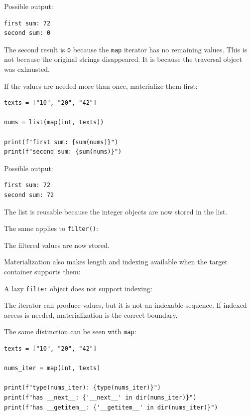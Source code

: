 Possible output:

\begin{verbatim}
first sum: 72
second sum: 0
\end{verbatim}

The second result is \texttt{0} because the \texttt{map} iterator has no remaining values. This is not because the original strings disappeared. It is because the traversal object was exhausted.

If the values are needed more than once, materialize them first:

\begin{verbatim}
texts = ["10", "20", "42"]

nums = list(map(int, texts))

print(f"first sum: {sum(nums)}")
print(f"second sum: {sum(nums)}")
\end{verbatim}

Possible output:

\begin{verbatim}
first sum: 72
second sum: 72
\end{verbatim}

The list is reusable because the integer objects are now stored in the list.

The same applies to \texttt{filter()}:



The filtered values are now stored.

Materialization also makes length and indexing available when the target container supports them:



A lazy \texttt{filter} object does not support indexing:



The iterator can produce values, but it is not an indexable sequence. If indexed access is needed, materialization is the correct boundary.

The same distinction can be seen with \texttt{map}:

\begin{verbatim}
texts = ["10", "20", "42"]

nums_iter = map(int, texts)

print(f"type(nums_iter): {type(nums_iter)}")
print(f"has __next__: {'__next__' in dir(nums_iter)}")
print(f"has __getitem__: {'__getitem__' in dir(nums_iter)}")
\end{verbatim}

